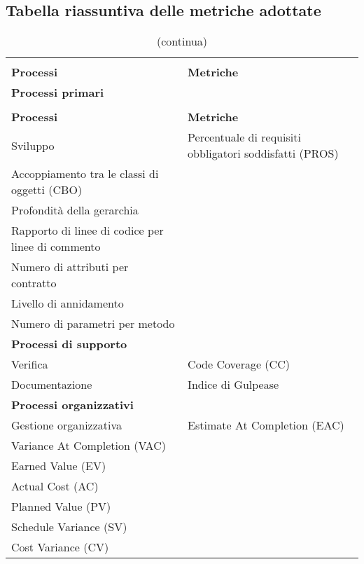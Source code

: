 \pagebreak
\subsection{Tabella riassuntiva delle metriche adottate}
\begin{longtable}{ >{\centering}p{}
		>{\centering}p{}}
	\rowcolor{white}\caption{Tabella riassuntiva delle metriche adottate}\\
	\rowcolorhead
	\textbf{\color{white}Processi}
	& \textbf{\color{white}Metriche} 
	\tabularnewline
	\rowcolorhead 
	\textbf{\centering\color{white}Processi primari}
	& \textbf{\color{white}} 
	\tabularnewline 	
	\endfirsthead
	\rowcolor{white}\caption[]{(continua)} \\
	\rowcolorhead 
	\textbf{\color{white}Processi}
	& \textbf{\color{white}Metriche} 
	\tabularnewline
	\endhead
	
	Sviluppo & Percentuale di requisiti obbligatori soddisfatti (PROS)\\
	Accoppiamento tra le classi di oggetti (CBO) \\Profondità della gerarchia \\Rapporto di linee di codice per linee di commento \\Numero di attributi per contratto \\Livello di annidamento \\Numero di parametri per metodo
	
	\tabularnewline
	\rowcolorhead 
	\textbf{\centering\color{white}Processi di supporto}
	& \textbf{\color{white}} 
	\tabularnewline
	\rowcolordark
	Verifica & Code Coverage (CC) 
	
	\tabularnewline
	\rowcolorlight
	Documentazione & Indice di Gulpease
	
	\tabularnewline
	\rowcolorhead 
	\textbf{\centering\color{white}Processi organizzativi}
	& \textbf{\color{white}} 
	\tabularnewline
	\rowcolordark
	Gestione organizzativa & Estimate At Completion (EAC)\\
	Variance At Completion (VAC) \\Earned Value (EV) \\ Actual Cost (AC) \\Planned Value (PV) \\Schedule Variance (SV) \\Cost Variance (CV)
	\tabularnewline
	
\end{longtable}